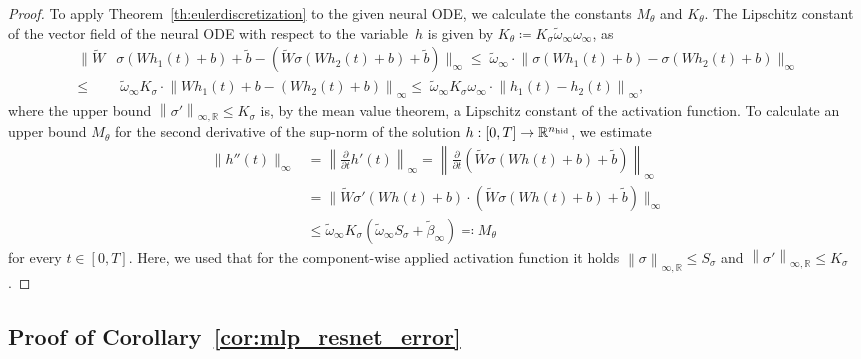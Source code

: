 \documentclass[10pt]{article}
\theoremstyle{definition}
\numberwithin{equation}{section}
\newcommand\norm[1]{\left\lVert#1\right\rVert}
\newcommand\normm[1]{\big\lVert#1\big\lVert}
\newcommand{\R}{\mathbb{R}}
\newcommand*{\nhid}{n_\textup{hid}}
\begin{document}
    \begin{proof}
	To apply Theorem~\ref{th:eulerdiscretization} to the given neural ODE, we calculate the constants $M_\theta$ and $K_\theta$. The Lipschitz constant of the vector field of the neural ODE with respect to the variable~$h$ is given by $K_\theta \coloneqq K_{\sigma} \widetilde{\omega}_\infty  \omega_\infty$, as
	\begin{align*}
		\normm{\widetilde{W} &\sigma(W h_1(t) +b) + \tilde{b} - (\widetilde{W} \sigma(W h_2(t) +b) + \tilde{b})}_\infty
		\leq \; \widetilde{\omega}_\infty  \cdot \normm{\sigma(W h_1(t) +b) -\sigma(W h_2(t) +b) }_\infty \\
		\leq &\; \widetilde{\omega}_\infty   K_\sigma \cdot\norm{Wh_1(t)+b-(Wh_2(t)+b)}_\infty \leq \; \widetilde{\omega}_\infty K_\sigma \omega_\infty \cdot \norm{h_1(t) -h_2(t)}_\infty,
	\end{align*}
	where the upper bound $\norm{\sigma'}_{\infty,\R} \leq K_\sigma$ is, by the mean value theorem, a Lipschitz constant of the activation function. 
	To calculate an upper bound $M_\theta$ for the second derivative of the sup-norm of the solution $h:[0,T] \rightarrow \R^{\nhid}$, we estimate
	\begin{align*}
		\normm{h''(t)}_\infty &= \norm{\frac{\partial}{\partial t} h'(t)}_\infty =  \norm{ \frac{\partial}{\partial t} \left(\widetilde{W} \sigma(W h(t) +b) + \tilde{b}\right)}_\infty \\
		&= \normm{\widetilde{W} \sigma'(Wh(t) + b) \cdot \left(\widetilde{W} \sigma(W h(t) +b) + \tilde{b}\right) }_\infty \\
		&\leq \widetilde{\omega}_\infty  K_{\sigma} \left( \widetilde{\omega}_\infty  S_\sigma + \tilde{\beta}_\infty\right) \eqqcolon M_\theta
	\end{align*}
	for every $t \in [0,T]$. Here, we used that for the component-wise applied activation function it holds $\norm{\sigma}_{\infty,\R} \leq S_\sigma$ and $\norm{\sigma'}_{\infty,\R} \leq K_\sigma$.
\end{proof}


    \subsection{Proof of Corollary~\ref{cor:mlp_resnet_error}}
    \label{app:cor_proof_resnet_mlp}
\end{document}
